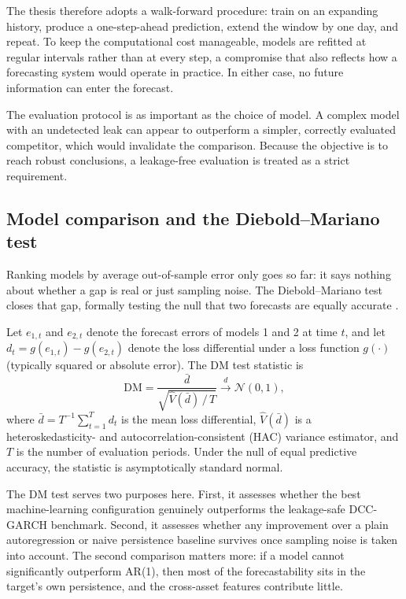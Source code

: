 The thesis therefore adopts a walk-forward procedure: train on an expanding history, produce a one-step-ahead prediction, extend the window by one day, and repeat. To keep the computational cost manageable, models are refitted at regular intervals rather than at every step, a compromise that also reflects how a forecasting system would operate in practice. In either case, no future information can enter the forecast.

The evaluation protocol is as important as the choice of model. A complex model with an undetected leak can appear to outperform a simpler, correctly evaluated competitor, which would invalidate the comparison. Because the objective is to reach robust conclusions, a leakage-free evaluation is treated as a strict requirement.

\subsection{Model comparison and the Diebold--Mariano test}

Ranking models by average out-of-sample error only goes so far: it says nothing about whether a gap is real or just sampling noise. The Diebold--Mariano test closes that gap, formally testing the null that two forecasts are equally accurate \cite{diebold1995}.

Let $e_{1,t}$ and $e_{2,t}$ denote the forecast errors of models 1 and 2 at time $t$, and let $d_t = g(e_{1,t}) - g(e_{2,t})$ denote the loss differential under a loss function $g(\cdot)$ (typically squared or absolute error). The DM test statistic is
\begin{equation}
    \mathrm{DM} = \frac{\bar{d}}{\sqrt{\hat{V}(\bar{d})\,/\, T}} \xrightarrow{d} \mathcal{N}(0,1),
\end{equation}
where $\bar{d} = T^{-1}\sum_{t=1}^{T} d_t$ is the mean loss differential, $\hat{V}(\bar{d})$ is a heteroskedasticity- and autocorrelation-consistent (HAC) variance estimator, and $T$ is the number of evaluation periods. Under the null of equal predictive accuracy, the statistic is asymptotically standard normal.

The DM test serves two purposes here. First, it assesses whether the best machine-learning configuration genuinely outperforms the leakage-safe DCC-GARCH benchmark. Second, it assesses whether any improvement over a plain autoregression or naive persistence baseline survives once sampling noise is taken into account. The second comparison matters more: if a model cannot significantly outperform AR(1), then most of the forecastability sits in the target's own persistence, and the cross-asset features contribute little.

